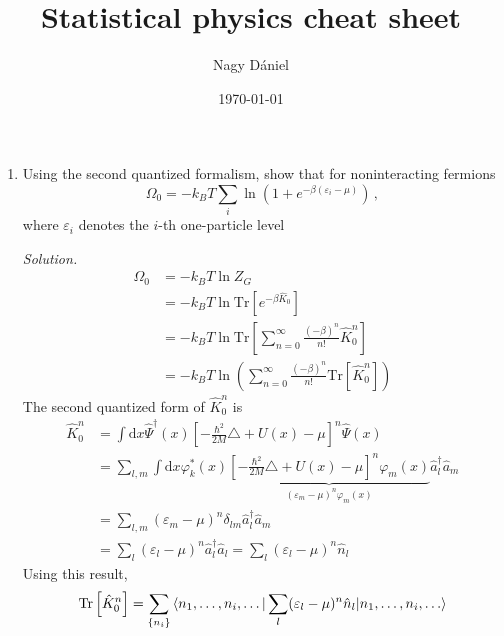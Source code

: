 \documentclass[11pt, a4paper]{article}
\title{Statistical physics cheat sheet}
\author{Nagy Dániel}
\date{\today}
\newcommand{\dd}{\mathrm{d}}
\newcommand{\Tr}[1]{\mathrm{Tr}\left[#1\right]}
\begin{document}
\maketitle
\newpage

\begin{enumerate}
    \item Using the second quantized formalism, show that for noninteracting fermions
    \begin{equation*}
        \Omega_0 = -k_BT\sum\limits_i \ln \left(1 + e^{-\beta(\varepsilon_i - \mu)}\right)\,,
    \end{equation*}
    where $\varepsilon_i$ denotes the $i$-th one-particle level
    \par\textit{Solution.}
    \begin{align*}
        \Omega_0 &= -k_BT\ln Z_G\\
        &= -k_BT \ln \Tr{e^{-\beta \hat K_0}}\\
        &= -k_BT \ln \Tr{\sum\limits_{n=0}^{\infty} \frac{(-\beta)^n}{n!}\hat K_0^n}\\
        &= -k_BT \ln \left(\sum\limits_{n=0}^{\infty} \frac{(-\beta)^n}{n!}\Tr{\hat K_0^n}\right)
    \end{align*}
    The second quantized form of $\hat K_0^n$ is 
    \begin{align*}
        \hat K_0^n &= \int \dd x \hat\Psi^{\dagger}(x)\left[-\frac{\hbar^2}{2M}\triangle + U(x)
        -\mu\right]^n\hat\Psi(x) \\
        & = \sum\limits_{l,m} \int \dd x  \varphi_k^*(x)\underbrace{\left[-\frac{\hbar^2}{2M}\triangle + U(x)
        -\mu\right]^n \varphi_m(x)}_{(\varepsilon_m - \mu)^n\varphi_m(x)} \hat a_l^{\dagger}\hat a_m \\
        & = \sum\limits_{l,m}(\varepsilon_m - \mu)^n\delta_{lm} \hat a_l^{\dagger}\hat a_m \\
        & = \sum\limits_l (\varepsilon_l-\mu)^n \hat a_l^{\dagger}\hat a_l 
        = \sum\limits_l (\varepsilon_l-\mu)^n \hat n_l
    \end{align*}
    Using this result, 
    \begin{align*}
        \Tr{\hat K_0^n} &= \sum\limits_{\{n_i\}} \braket{n_1, \dots, n_i, \dots | \sum\limits_l (\varepsilon_l-\mu)^n \hat n_l | n_1, \dots, n_i, \dots}\\

\end{align*}
\end{enumerate}
\end{document}
